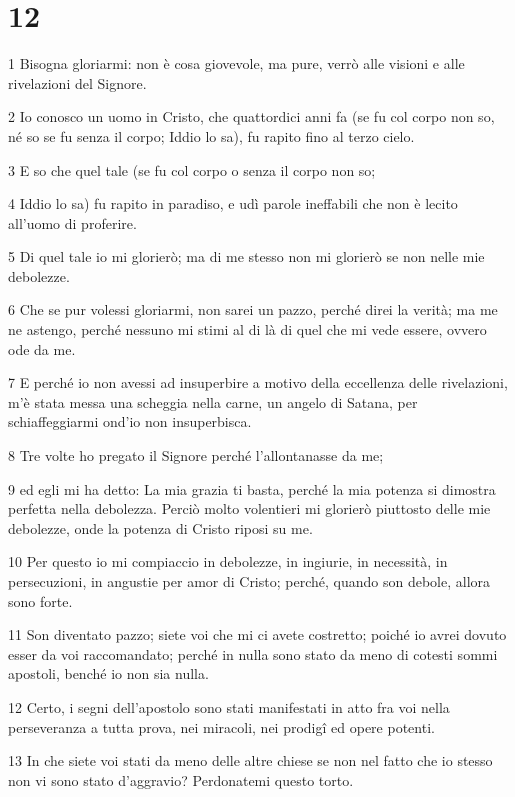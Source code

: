 \chapter{12}

\par 1 Bisogna gloriarmi: non è cosa giovevole, ma pure, verrò alle visioni e alle rivelazioni del Signore.
\par 2 Io conosco un uomo in Cristo, che quattordici anni fa (se fu col corpo non so, né so se fu senza il corpo; Iddio lo sa), fu rapito fino al terzo cielo.
\par 3 E so che quel tale (se fu col corpo o senza il corpo non so;
\par 4 Iddio lo sa) fu rapito in paradiso, e udì parole ineffabili che non è lecito all'uomo di proferire.
\par 5 Di quel tale io mi glorierò; ma di me stesso non mi glorierò se non nelle mie debolezze.
\par 6 Che se pur volessi gloriarmi, non sarei un pazzo, perché direi la verità; ma me ne astengo, perché nessuno mi stimi al di là di quel che mi vede essere, ovvero ode da me.
\par 7 E perché io non avessi ad insuperbire a motivo della eccellenza delle rivelazioni, m'è stata messa una scheggia nella carne, un angelo di Satana, per schiaffeggiarmi ond'io non insuperbisca.
\par 8 Tre volte ho pregato il Signore perché l'allontanasse da me;
\par 9 ed egli mi ha detto: La mia grazia ti basta, perché la mia potenza si dimostra perfetta nella debolezza. Perciò molto volentieri mi glorierò piuttosto delle mie debolezze, onde la potenza di Cristo riposi su me.
\par 10 Per questo io mi compiaccio in debolezze, in ingiurie, in necessità, in persecuzioni, in angustie per amor di Cristo; perché, quando son debole, allora sono forte.
\par 11 Son diventato pazzo; siete voi che mi ci avete costretto; poiché io avrei dovuto esser da voi raccomandato; perché in nulla sono stato da meno di cotesti sommi apostoli, benché io non sia nulla.
\par 12 Certo, i segni dell'apostolo sono stati manifestati in atto fra voi nella perseveranza a tutta prova, nei miracoli, nei prodigî ed opere potenti.
\par 13 In che siete voi stati da meno delle altre chiese se non nel fatto che io stesso non vi sono stato d'aggravio? Perdonatemi questo torto.
